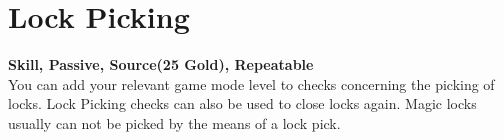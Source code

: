 \section{Lock Picking}\label{sec:lockPicking}
\textbf{Skill, Passive, Source(25 Gold), Repeatable}\\
You can add your relevant game mode level to checks concerning the picking of locks.
Lock Picking checks can also be used to close locks again.
Magic locks usually can not be picked by the means of a lock pick.